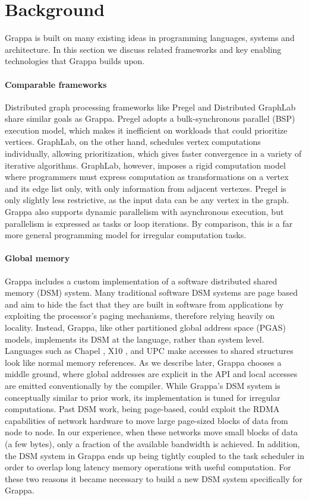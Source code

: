 \section{Background}

Grappa is built on many existing ideas in programming languages, systems and
architecture. In this section we discuss related frameworks and key enabling
technologies that Grappa builds upon.

\paragraph{Comparable frameworks} Distributed graph processing
frameworks like Pregel \cite{pregel:2010} and Distributed GraphLab
\cite{distgraphlab:vldb12} share similar goals as Grappa. Pregel adopts
a bulk-synchronous parallel (BSP) execution model, which makes it
inefficient on workloads that could prioritize vertices. GraphLab, on
the other hand, schedules vertex computations individually, allowing
prioritization, which gives faster convergence in a variety of iterative
algorithms.  GraphLab, however, imposes a rigid computation model where
programmers must express computation as transformations on a vertex and
its edge list only, with only information from adjacent vertexes. Pregel
is only slightly less restrictive, as the input data can be any vertex
in the graph.  Grappa also supports dynamic parallelism with
asynchronous execution, but parallelism is expressed as tasks or loop
iterations. By comparison, this is a far more general programming model
for irregular computation tasks.

\paragraph{Global memory} Grappa includes a custom implementation of a
software distributed shared memory (DSM) system. Many traditional
software DSM systems are page based~\cite{Treadmarks,munin} and aim to
hide the fact that they are built in software from applications by
exploiting the processor's paging mechanisms, therefore relying heavily
on locality. Instead, Grappa, like other partitioned global address
space (PGAS) models, implements its DSM at the language, rather than
system level. Languages such as Chapel \cite{Chamberlain:2007}, X10
\cite{X10:2005}, and UPC \cite{upc:2005} make accesses to shared
structures look like normal memory references. As we describe later,
Grappa chooses a middle ground, where global addresses are explicit in
the API and local accesses are emitted conventionally by the compiler. 
While Grappa's DSM system is conceptually similar to prior work, its
implementation is tuned for irregular computations.  Past DSM work,
being page-based, could exploit the RDMA capabilities of network
hardware to move large page-sized blocks of data from node to node.  In
our experience, when these networks move small blocks of data (a few
bytes), only a fraction of the available bandwidth is achieved.  In
addition, the DSM system in Grappa ends up being tightly coupled to the
task scheduler in order to overlap long latency memory operations with
useful computation.  For these two reasons it became necessary to build
a new DSM system specifically for Grappa. 


